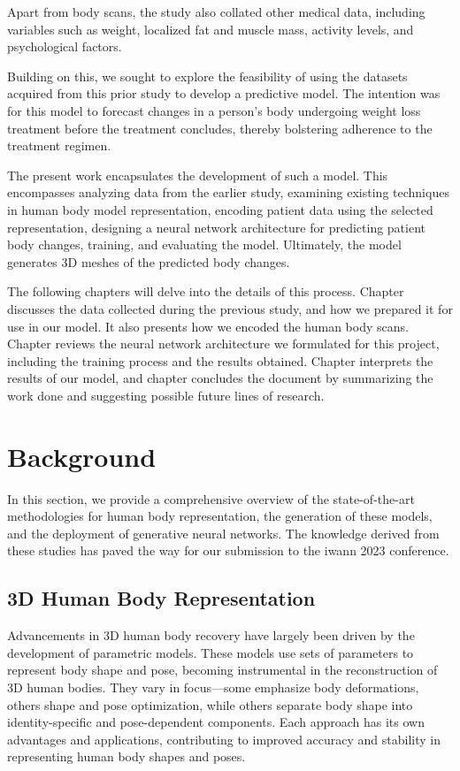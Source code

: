 Apart from body scans, the study also collated other medical data, including
variables such as weight, localized fat and muscle mass, activity levels, and
psychological factors.

Building on this, we sought to explore the feasibility of using the datasets
acquired from this prior study to develop a predictive model. The intention was
for this model to forecast changes in a person's body undergoing weight loss
treatment before the treatment concludes, thereby bolstering adherence to the
treatment regimen.

The present work encapsulates the development of such a model. This encompasses
analyzing data from the earlier study, examining existing techniques in human
body model representation, encoding patient data using the selected
representation, designing a neural network architecture for predicting patient
body changes, training, and evaluating the model. Ultimately, the model
generates 3D meshes of the predicted body changes.

The following chapters will delve into the details of this process. Chapter
 discusses the data collected during the previous study, and
how we prepared it for use in our model. It also presents how we encoded the
human body scans. Chapter  reviews the neural network
architecture we formulated for this project, including the training process and
the results obtained. Chapter  interprets the results of
our model, and chapter  concludes the document by
summarizing the work done and suggesting possible future lines of research.

\section{Background}

In this section, we provide a comprehensive overview of the state-of-the-art
methodologies for human body representation, the generation of these models,
and the deployment of generative neural networks. The knowledge derived from
these studies has paved the way for our submission to the \gls{iwann} 2023
conference. 

\subsection{3D Human Body Representation}

Advancements in 3D human body recovery have largely been driven by the
development of parametric models. These models use sets of parameters to
represent body shape and pose, becoming instrumental in the reconstruction of
3D human bodies. They vary in focus—some emphasize body deformations, others
shape and pose optimization, while others separate body shape into
identity-specific and pose-dependent components. Each approach has its own
advantages and applications, contributing to improved accuracy and stability in
representing human body shapes and poses.

